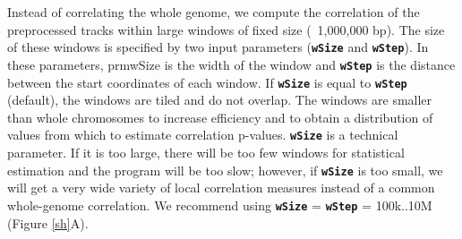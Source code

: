 \documentclass{article}
\newcommand{\prm}[1]{\texttt{\textbf{{#1}}}}
\begin{document}
Instead of correlating the whole genome, we compute the correlation of the preprocessed tracks within large windows of fixed size (~1,000,000 bp). The size of these windows is specified by two input parameters (\prm{wSize} and \prm{wStep}). In these parameters, prm{wSize} is the width of the window and \prm{wStep} is the distance between the start coordinates of each window. If \prm{wSize} is equal to \prm{wStep} (default), the windows are tiled and do not overlap. The windows are smaller than whole chromosomes to increase efficiency and to obtain a distribution of values from which to estimate correlation p-values. \prm{wSize} is a technical parameter. If it is too large, there will be too few windows for statistical estimation and the program will be too slow; however, if \prm{wSize} is too small, we will get a very wide variety of local correlation measures instead of a common whole-genome correlation. We recommend using \prm{wSize} = \prm{wStep} = 100k..10M (Figure \ref{sh}A).
\end{document}
